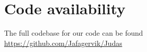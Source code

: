 \section{Code availability}

The full codebase for our code can be found \href{here}{https://github.com/Jafagervik/Judas}